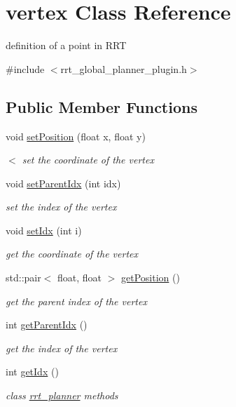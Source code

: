\hypertarget{classvertex}{}\section{vertex Class Reference}
\label{classvertex}


definition of a point in R\+RT  




{\ttfamily \#include $<$rrt\+\_\+global\+\_\+planner\+\_\+plugin.\+h$>$}

\subsection*{Public Member Functions}
\begin{DoxyCompactItemize}
\item 
void \hyperlink{classvertex_a6f60229a39cc2c87517d5da16737c0fe}{set\+Position} (float x, float y)
\begin{DoxyCompactList}\small\item\em $<$ set the coordinate of the vertex \end{DoxyCompactList}\item 
void \hyperlink{classvertex_a88b35e277467413154d64dceaffc26f7}{set\+Parent\+Idx} (int idx)
\begin{DoxyCompactList}\small\item\em set the index of the vertex \end{DoxyCompactList}\item 
void \hyperlink{classvertex_ac723537f91a75552cf98d53778327408}{set\+Idx} (int i)
\begin{DoxyCompactList}\small\item\em get the coordinate of the vertex \end{DoxyCompactList}\item 
std\+::pair$<$ float, float $>$ \hyperlink{classvertex_af3192c89865d850b2a656e2ee840907d}{get\+Position} ()
\begin{DoxyCompactList}\small\item\em get the parent index of the vertex \end{DoxyCompactList}\item 
int \hyperlink{classvertex_aa7d695c2874361b913447b79bc047814}{get\+Parent\+Idx} ()
\begin{DoxyCompactList}\small\item\em get the index of the vertex \end{DoxyCompactList}\item 
int \hyperlink{classvertex_ae21069e33ecfb0c5cb7c17befe1c3e60}{get\+Idx} ()
\begin{DoxyCompactList}\small\item\em class \hyperlink{namespacerrt__planner}{rrt\+\_\+planner} methods \end{DoxyCompactList}\end{DoxyCompactItemize}


